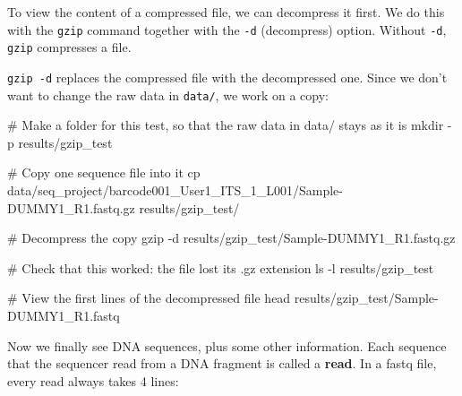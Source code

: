 \documentclass[
  letterpaper,
  DIV=11,
  numbers=noendperiod]{scrreprt}
\newenvironment{Shaded}{}{}
\newcommand{\AttributeTok}[1]{\textcolor[rgb]{0.84,0.23,0.29}{#1}}
\newcommand{\CommentTok}[1]{\textcolor[rgb]{0.42,0.45,0.49}{#1}}
\newcommand{\FunctionTok}[1]{\textcolor[rgb]{0.44,0.26,0.76}{#1}}
\newcommand{\NormalTok}[1]{\textcolor[rgb]{0.14,0.16,0.18}{#1}}
\begin{document}
To view the content of a compressed file, we can decompress it first. We
do this with the \texttt{gzip} command together with the \texttt{-d}
(decompress) option. Without \texttt{-d}, \texttt{gzip} compresses a
file.

\texttt{gzip\ -d} replaces the compressed file with the decompressed
one. Since we don't want to change the raw data in \texttt{data/}, we
work on a copy:

\begin{Shaded}
\begin{Highlighting}[]
\CommentTok{\# Make a folder for this test, so that the raw data in data/ stays as it is}
\FunctionTok{mkdir} \AttributeTok{{-}p}\NormalTok{ results/gzip\_test}

\CommentTok{\# Copy one sequence file into it}
\FunctionTok{cp}\NormalTok{ data/seq\_project/barcode001\_User1\_ITS\_1\_L001/Sample{-}DUMMY1\_R1.fastq.gz results/gzip\_test/}

\CommentTok{\# Decompress the copy}
\FunctionTok{gzip} \AttributeTok{{-}d}\NormalTok{ results/gzip\_test/Sample{-}DUMMY1\_R1.fastq.gz}

\CommentTok{\# Check that this worked: the file lost its .gz extension}
\FunctionTok{ls} \AttributeTok{{-}l}\NormalTok{ results/gzip\_test}

\CommentTok{\# View the first lines of the decompressed file}
\FunctionTok{head}\NormalTok{ results/gzip\_test/Sample{-}DUMMY1\_R1.fastq}
\end{Highlighting}
\end{Shaded}

Now we finally see DNA sequences, plus some other information. Each
sequence that the sequencer read from a DNA fragment is called a
\textbf{read}. In a fastq file, every read always takes 4 lines:
\end{document}
